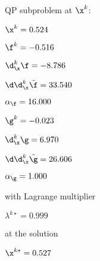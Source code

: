 QP subproblem at $\x^{k}$:

\bigskip
$\x^k=   0.524$


$\f^k =  -0.516$

$\d^k_{\x} \f =  -8.786$

$\d\d^k_{\x} \tilde \f =  33.540$

$\alpha_{\footnotesize\f} =  16.000$

\bigskip
$\g^k =  -0.023$

$\d^k_{\x}\g =   6.970$

$\d\d^k_{\x} \tilde \g =  26.606$

$\alpha_{\footnotesize\g} =   1.000$

\bigskip
with Lagrange multiplier

$\lambda^{k\star} =   0.999$

at the solution

$\x^{k\star} =   0.527$

